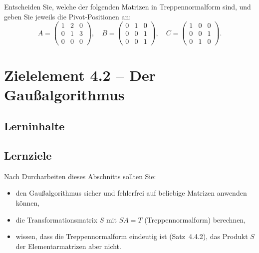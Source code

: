 \documentclass[a4paper,12pt]{article}
\begin{document}
Entscheiden Sie, welche der folgenden Matrizen in Treppennormalform sind, und
geben Sie jeweils die Pivot-Positionen an:
\[
  A = \begin{pmatrix} 1 & 2 & 0 \\ 0 & 1 & 3 \\ 0 & 0 & 0 \end{pmatrix}, \quad
  B = \begin{pmatrix} 0 & 1 & 0 \\ 0 & 0 & 1 \\ 0 & 0 & 1 \end{pmatrix}, \quad
  C = \begin{pmatrix} 1 & 0 & 0 \\ 0 & 0 & 1 \\ 0 & 1 & 0 \end{pmatrix}.
\]

\newpage

\section*{Zielelement 4.2 -- Der Gaußalgorithmus}

\subsection*{Lerninhalte}

\begin{center}
\end{center}

\subsection*{Lernziele}

Nach Durcharbeiten dieses Abschnitts sollten Sie:
\begin{itemize}
  \item den Gaußalgorithmus sicher und fehlerfrei auf beliebige Matrizen anwenden können,
  \item die Transformationsmatrix $S$ mit $SA = T$ (Treppennormalform) berechnen,
  \item wissen, dass die Treppennormalform eindeutig ist (Satz~4.4.2), das Produkt
        $S$ der Elementarmatrizen aber nicht.
\end{itemize}
\end{document}

